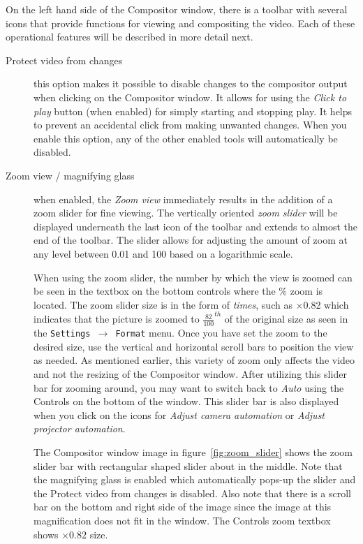 On the left hand side of the Compositor window, there is a toolbar with several icons that
provide functions for viewing and compositing the video. Each of these operational features 
will be described in more detail next. 
\begin{description}
    \item[Protect video from changes] this option makes it possible to disable changes to the
compositor output when clicking on the Compositor window. It allows for using the
\textit{Click to play} button (when enabled) for simply starting and stopping play.  It helps
to prevent an accidental click from making unwanted changes. When you enable this option, any
of the other enabled tools will automatically be disabled.

     \item[Zoom view / magnifying glass] when enabled, the \textit{Zoom view} immediately results
in the addition of a zoom slider for fine viewing.  
The vertically oriented \textit{zoom slider} will be displayed underneath the last icon of the toolbar and extends
to almost the end of the toolbar.
The slider allows for adjusting the amount of zoom at any level between 0.01 and 100 based on a logarithmic scale.  

When using the zoom slider, the number by which the view is zoomed can be seen in the textbox 
on the bottom controls where the \% zoom is located.  
The zoom slider size is in the form of \textit{times}, such as $\times$0.82 which indicates that the picture is zoomed to $\frac{82}{100}^{th}$ of the original size as seen in the \texttt{Settings $\rightarrow$ Format} menu.  
Once you have set the zoom to the desired size, use the vertical and horizontal scroll bars to position the view as needed.
As mentioned earlier, this
variety of zoom only affects the video and not the resizing of the Compositor window.  After
utilizing this slider bar for zooming around, you may want to switch back to \textit{Auto} 
using the Controls on the bottom of the window.
This slider bar is also displayed
when you click on the icons for \textit{Adjust camera automation} or \textit{Adjust projector automation}.  

The Compositor window image in figure~\ref{fig:zoom_slider} shows the zoom slider bar with rectangular shaped slider about in the middle.  Note that the magnifying glass is enabled which
automatically pops-up the slider and the Protect video from changes is disabled.  Also note that
there is a scroll bar on the bottom and right side of the image since the image at this magnification
does not fit in the window.
The Controls zoom textbox shows $\times0.82$ size.  
\end{description}

